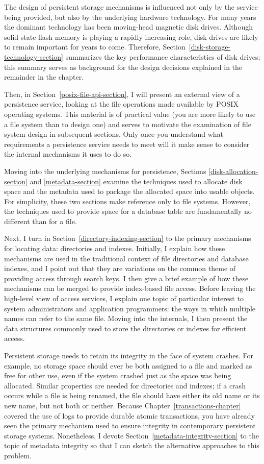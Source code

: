 The design of persistent storage mechanisms is influenced not only by
the service being provided, but also by the underlying hardware
technology.  For many years the dominant technology has been
moving-head magnetic disk drives.
Although solid-state flash memory is playing a rapidly increasing
role, disk drives are likely to remain important
for years to come.  Therefore, Section~\ref{disk-storage-technology-section} summarizes
the key performance characteristics of disk drives;
this summary serves
as background for the design decisions explained in the remainder
in the chapter.

Then, in Section~\ref{posix-file-api-section}, I will present an external view of a persistence service,
looking at the file operations made available by POSIX operating
systems.  This material is of practical value (you are more likely to
use a file system than to design one) and serves to motivate the
examination of file system design in subsequent sections.  Only once you
understand what requirements a persistence service needs to meet will
it make sense to consider the internal mechanisms it uses to do so.

Moving into the underlying mechanisms for persistence,
Sections \ref{disk-allocation-section} and \ref{metadata-section}
examine the
techniques used to allocate disk space and the metadata used to
package the allocated space into usable objects.  For simplicity,
these two sections make reference only to file systems.  However, the
techniques used to provide space for a database table are fundamentally no
different than for a file.

Next, I turn in Section~\ref{directory-indexing-section} to the
primary mechanisms for locating data: directories and
indexes.  Initially, I explain how these mechanisms are used in the traditional
context of
file directories and database indexes, and I point out that they are variations
on the common theme of providing access through search keys.  I then
give a
brief example of how these mechanisms can be merged to provide index-based file access.  Before
leaving the high-level view of access services, I explain
one topic of particular interest to system administrators and
application programmers: the ways
in which multiple names can refer to the same file.  Moving into the
internals, I then
present the data structures commonly used to store the directories or
indexes for efficient access.

Persistent storage needs to retain its integrity in the face of system
crashes.  For example, no storage space should ever be both assigned to a
file and marked as free for other use, even if the system crashed just
as the space was being allocated.  Similar properties are needed for
directories and indexes; if a crash occurs while a file
is being renamed, the file should have either its old name or its new
name, but not both or neither.  Because
Chapter~\ref{transactions-chapter} covered the use of logs to provide
durable atomic transactions, you have already seen the primary
mechanism used to ensure integrity in contemporary persistent storage
systems.  Nonetheless, I devote
Section~\ref{metadata-integrity-section} to the topic of metadata
integrity so that I can sketch the alternative approaches to
this problem.

